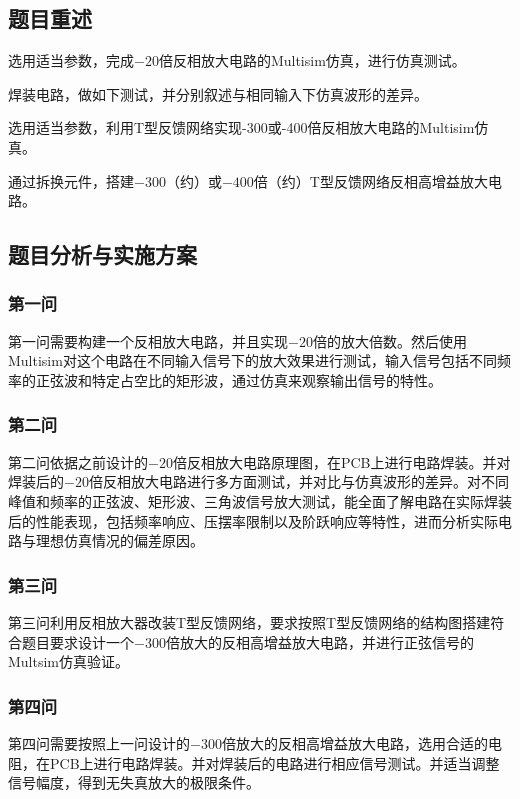 \documentclass[./测控三级项目.tex]{subfiles} %
\begin{document}
	\subsection{题目重述}
		\begin{compactenum}
			\item 选用适当参数，完成$-20$倍反相放大电路的Multisim仿真，进行仿真测试。
			\item 焊装电路，做如下测试，并分别叙述与相同输入下仿真波形的差异。
			\item 选用适当参数，利用T型反馈网络实现-300或-400倍反相放大电路的Multisim仿真。
			\item 通过拆换元件，搭建$-300$（约）或$-400倍$（约）T型反馈网络反相高增益放大电路。
		\end{compactenum}
	\subsection{题目分析与实施方案}
		\subsubsection{第一问}
			第一问需要构建一个反相放大电路，并且实现$-20$倍的放大倍数。然后使用Multisim对这个电路在不同输入信号下的放大效果进行测试，输入信号包括不同频率的正弦波和特定占空比的矩形波，通过仿真来观察输出信号的特性。
		\subsubsection{第二问}
			第二问依据之前设计的$-20$倍反相放大电路原理图，在PCB上进行电路焊装。并对焊装后的$-20$倍反相放大电路进行多方面测试，并对比与仿真波形的差异。对不同峰值和频率的正弦波、矩形波、三角波信号放大测试，能全面了解电路在实际焊装后的性能表现，包括频率响应、压摆率限制以及阶跃响应等特性，进而分析实际电路与理想仿真情况的偏差原因。
		\subsubsection{第三问}
			第三问利用反相放大器改装T型反馈网络，要求按照T型反馈网络的结构图搭建符合题目要求设计一个$-300$倍放大的反相高增益放大电路，并进行正弦信号的Multsim仿真验证。
		\subsubsection{第四问}
			第四问需要按照上一问设计的$-300$倍放大的反相高增益放大电路，选用合适的电阻，在PCB上进行电路焊装。并对焊装后的电路进行相应信号测试。并适当调整信号幅度，得到无失真放大的极限条件。
	
\end{document}
